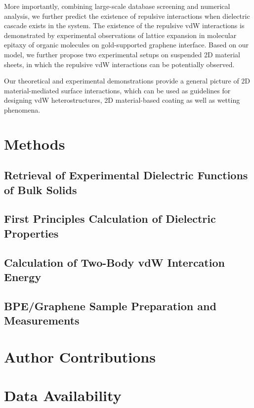 More importantly, combining large-scale database screening and
numerical analysis, we further predict the existence of repulsive
interactions when dielectric cascade exists in the system. The
existence of the repulsive vdW interactions is demonstrated by
experimental observations of lattice expansion in molecular epitaxy of
organic molecules on gold-supported graphene interface.
%
Based on our model, we further propose two experimental setups on
suspended 2D material sheets, in which the repulsive vdW interactions
can be potentially observed.

Our theoretical and experimental demonstrations provide a general
picture of 2D material-mediated surface interactions, which can be
used as guidelines for designing vdW heterostructures, 2D
material-based coating as well as wetting phenomena.


\section{Methods}
\label{sec:vdw-methods}

\subsection{Retrieval of Experimental Dielectric Functions of Bulk Solids}
\label{sec:retr-exper-diel}


\subsection{First Principles Calculation of Dielectric Properties}
\label{sec:firsc-diel-prop}


\subsection{Calculation of Two-Body vdW Intercation Energy}
\label{sec:calculation-two-body}

\subsection{BPE/Graphene Sample Preparation and Measurements}
\label{sec:graph-sample-prep}

\section{Author Contributions}
\label{sec:vdw-author-contributions}


\section{Data Availability}
\label{sec:vdw-data-availability}










